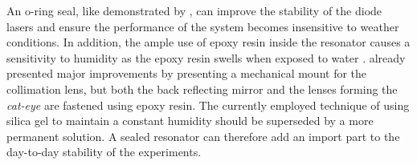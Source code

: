 An o-ring seal, like demonstrated by \cite{ecdl_silicone_housing}, can improve the stability of the diode lasers and ensure the performance of the system becomes insensitive to weather conditions. In addition, the ample use of epoxy resin inside the resonator causes a sensitivity to humidity as the epoxy resin swells when exposed to water \cite{epoxy_humidity}. \citeauthor{thesis_tilman} \cite{thesis_tilman} already presented major improvements by presenting a mechanical mount for the collimation lens, but both the back reflecting mirror and the lenses forming the \textit{cat-eye} \cite{ecdl_paris} are fastened using epoxy resin. The currently employed technique of using silica gel to maintain a constant humidity should be superseded by a more permanent solution. A sealed resonator can therefore add an import part to the day-to-day stability of the experiments.
